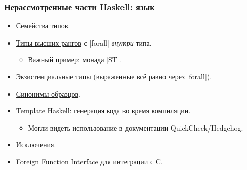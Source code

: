\documentclass[11pt]{beamer}
\begin{document}
\begin{frame}[fragile]
\frametitle{Нерассмотренные части Haskell: язык}
\begin{itemize}
    \item \href{https://downloads.haskell.org/~ghc/latest/docs/html/users_guide/glasgow_exts.html#type-families}{Семейства типов}.
    \item \href{https://downloads.haskell.org/~ghc/latest/docs/html/users_guide/glasgow_exts.html#arbitrary-rank-polymorphism}{Типы высших рангов} с \haskinline|forall| \emph{внутри} типа.
    \begin{itemize}
        \item Важный пример: монада \haskinline|ST|.
    \end{itemize}
    \item \href{https://downloads.haskell.org/~ghc/latest/docs/html/users_guide/glasgow_exts.html#existentially-quantified-data-constructors}{Экзистенциальные типы} (выраженные всё равно через \haskinline|forall|).
    \item \href{https://downloads.haskell.org/~ghc/latest/docs/html/users_guide/glasgow_exts.html#pattern-synonyms}{Синонимы образцов}.
    \item \href{https://downloads.haskell.org/~ghc/latest/docs/html/users_guide/glasgow_exts.html#template-haskell}{Template Haskell}: генерация кода во время компиляции.
        \begin{itemize}
            \item Могли видеть использование в документации QuickCheck/Hedgehog.
        \end{itemize}
    \item Исключения.
    \item Foreign Function Interface для интеграции с C.
\end{itemize}
\end{frame}
\end{document}
